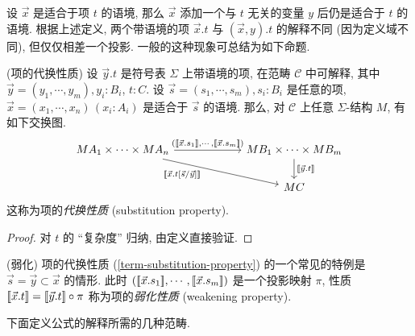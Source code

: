 设 $\vec x$ 是适合于项 $t$ 的语境, 那么 $\vec x$ 添加一个与 $t$ 无关的变量 $y$ 后仍是适合于 $t$ 的语境.
根据上述定义, 两个带语境的项 $\vec x.t$ 与 $(\vec x,y).t$ 的解释不同 (因为定义域不同), 但仅仅相差一个投影. 一般的这种现象可总结为如下命题.

\begin{prop}
	[label={term-substitution-property}]
	{(项的代换性质)}
	设 $\vec y.t$ 是符号表 $\Sigma$ 上带语境的项, 在范畴 $\mathcal C$ 中可解释,
	其中 $\vec y = (y_1,\cdots,y_m), y_i\colon B_i$, $t\colon C$.
	设 $\vec s = (s_1,\cdots,s_m), s_i\colon B_i$ 是任意的项, $\vec x=(x_1,\cdots,x_n)\,(x_i\colon A_i)$ 是适合于 $\vec s$ 的语境.
	那么, 对 $\mathcal C$ 上任意 $\Sigma$-结构 $M$,
	有如下交换图.
	\[\begin{tikzcd}[ampersand replacement=\&,column sep=6em]
		{MA_1\times\cdots\times MA_n} \& {MB_1\times\cdots\times MB_m} \\
		\& MC
		\arrow["{(\interpretation{\vec x.s_1},\cdots,\interpretation{\vec x.s_m})}", from=1-1, to=1-2]
		\arrow["{\interpretation{\vec y. t}}", from=1-2, to=2-2]
		\arrow["{\interpretation{\vec x. t[\vec s/ \vec y]}}"'{pos=0.35}, from=1-1, to=2-2]
	\end{tikzcd}\]
	这称为项的\emph{代换性质} (substitution property).
\end{prop}

\begin{proof}
	对 $t$ 的 ``复杂度'' 归纳, 由定义直接验证.
\end{proof}

\begin{example}
	{(弱化)}
	项的代换性质 (\ref{term-substitution-property}) 的一个常见的特例是 $\vec s = \vec y\subset \vec x$ 的情形.
	此时 $({[\![\vec x.s_1]\!]},\cdots,{[\![\vec x.s_m]\!]})$ 是一个投影映射 $\pi$,
	性质 ${[\![\vec x.t]\!]} = {[\![\vec y.t]\!]}\circ \pi$ 称为项的\emph{弱化性质} (weakening property).
\end{example}


下面定义公式的解释所需的几种范畴.

